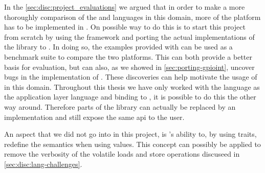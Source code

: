 In the \autoref{sec:disc:project_evaluations} we argued that in order to make a more thoroughly comparison of the {\C} and {\rust} languages in this domain, more of the platform has to be implemented in {\rust}.
On possible way to do this is to start this project from scratch by using the  framework and porting the actual implementations of the {\emlib} library to {\rust}.
In doing so, the examples provided with {\emlib} can be used as a benchmark suite to compare the two platforms.
This can both provide a better basis for evaluation, but can also, as we showed in \autoref{sec:porting-gpioint}, uncover bugs in the {\C} implementation of {\emlib}.
These discoveries can help motivate the usage of {\rust} in this domain.
Throughout this thesis we have only worked with the {\rust} language as the application layer language and binding to {\C}, it is possible to do this the other way around.
Therefore parts of the {\emlib} library can actually be replaced by an {\rust} implementation and still expose the same \gls{api} to the user.

An aspect that we did not go into in this project, is {\rust}'s ability to, by using traits, redefine the semantics when using values.
This concept can possibly be applied to remove the verbosity of the volatile loads and store operations discuseed in \autoref{sec:disc:lang-challenges}.
